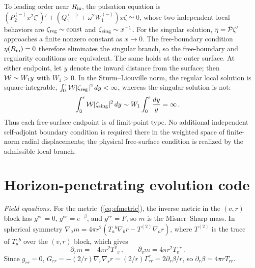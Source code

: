 \documentclass[%
 reprint,
 amsmath,amssymb,
 aps,prd,
 superscriptaddress,
]{revtex4-2}
\begin{document}
To leading order near $R_{\rm in}$, the pulsation equation is $(P_2^{(-)}x^2\zeta')'+(Q_1^{(-)}+\omega^2W_1^{(-)})x\zeta \simeq0$, whose two independent local behaviors are $\zeta_{\rm reg}\sim{\rm const}$ and $\zeta_{\rm sing}\sim x^{-1}$. For the singular solution, $\eta={\cal P}\zeta'$ approaches a finite nonzero constant as $x\to0$. The free-boundary condition $\eta(R_{\rm in})=0$ therefore eliminates the singular branch, so the free-boundary and regularity conditions are equivalent. The same holds at the outer surface. At either endpoint, let $y$ denote the inward distance from the surface; then ${\cal W}\sim W_1 y$ with $W_1>0$. In the Sturm--Liouville norm, the regular local solution is square-integrable, $\int_0^\epsilon {\cal W}|\zeta_{\rm reg}|^2\,dy<\infty$, whereas the singular solution is not:
\begin{equation}
\int_0^\epsilon {\cal W}|\zeta_{\rm sing}|^2\,dy
\sim W_1\int_0^\epsilon\frac{dy}{y}=\infty\,.
\end{equation}
Thus each free-surface endpoint is of limit-point type. No additional independent self-adjoint boundary condition is required there in the weighted space of finite-norm radial displacements; the physical free-surface condition is realized by the admissible local branch.

\section{Horizon-penetrating evolution code}
\label{app:ef}

\emph{Field equations.} For the metric~(\ref{eq:efmetric}), the inverse metric in the $(v,r)$ block has $g^{vv}=0$, $g^{vr}=e^{-\beta}$, and $g^{rr}=F$, so $m$ is the Misner--Sharp mass. In spherical symmetry $\nabla_am=4\pi r^2\left(T_a{}^b\nabla_br-T^{(2)}\nabla_ar\right)$, where $T^{(2)}$ is the trace of $T_a{}^b$ over the $(v,r)$ block, which gives
\begin{equation}
\partial_rm=-4\pi r^2T^v{}_v\,,\qquad \partial_vm=4\pi r^2T_v{}^r\,.
\end{equation}
Since $g_{rr}=0$, $G_{rr}=-(2/r)\nabla_r\nabla_rr=(2/r)\Gamma^r_{rr}=2\partial_r\beta/r$, so $\partial_r\beta=4\pi rT_{rr}$.
\end{document}
